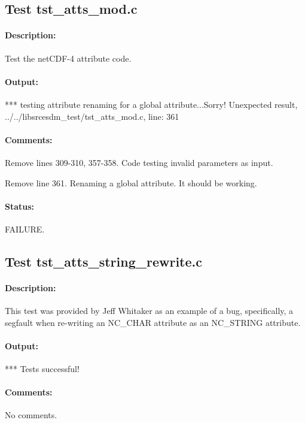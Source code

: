 \subsection{Test tst\_atts\_mod.c}

\paragraph{Description:} Test the netCDF-4 attribute code.

\paragraph{Output:}

*** testing attribute renaming for a global attribute...Sorry! Unexpected result, ../../libsrcesdm\_test/tst\_atts\_mod.c, line: 361

\paragraph{Comments:} Remove lines 309-310, 357-358. Code testing invalid parameters as input.

Remove line 361. Renaming a global attribute. It should be working.

\paragraph{Status:} FAILURE.

\subsection{Test tst\_atts\_string\_rewrite.c}

\paragraph{Description:} This test was provided by Jeff Whitaker as an example of a bug, specifically, a segfault when re-writing an NC\_CHAR attribute as an NC\_STRING attribute.

\paragraph{Output:} *** Tests successful!

\paragraph{Comments:} No comments.

